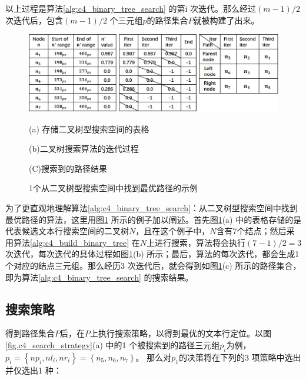         以上过程是算法\ref{alg:c4_binary_tree_search} 的第i 次迭代。那么经过$(m-1)/2$次迭代后，包含$(m-1)/2$ 个三元组$p$的路径集合$P$就被构建了出来。

        \begin{figure}[!h]
        \centering
        \includegraphics[width=\textwidth]{./figures/c4_bianry_tree_search.jpg}
        \begin{minipage}[t]{0.33\linewidth}
        \centerline{\small (a) 存储二叉树型搜索空间的表格}
        \end{minipage}
        \begin{minipage}[t]{0.33\linewidth}
        \centerline{\small(b)二叉树搜索算法的迭代过程}
        \end{minipage}
        \begin{minipage}[t]{0.26\linewidth}
        \centerline{\small(C)搜索到的路径结果}
        \end{minipage}
        \caption{1个从二叉树型搜索空间中找到最优路径的示例}
        \label{fig.c4_bianry_tree_search}
        \end{figure}

        为了更直观地理解算法\ref{alg:c4_binary_tree_search}：从二叉树型搜索空间中找到最优路径的算法，这里用图\ref{fig.c4_bianry_tree_search} 所示的例子加以阐述。首先图\ref{fig.c4_bianry_tree_search}(a) 中的表格存储的是代表候选文本行搜索空间的二叉树$N$，且在这个例子中，$N$含有7个结点；然后采用算法\ref{alg:c4_build_binary_tree} 在$N$上进行搜索，算法将会执行$(7-1)/2=3$ 次迭代，每次迭代的具体过程如图\ref{fig.c4_bianry_tree_search}(b) 所示；最后，算法的每次迭代，都会生成1 个对应的结点三元组。那么经历3 次迭代后，就会得到如图\ref{fig.c4_bianry_tree_search}(c) 所示的路径集合，即为算法\ref{alg:c4_binary_tree_search} 的搜索结果。

        \subsection{搜索策略}
        \label{sec.c4_searching strategies}

        得到路径集合$P$后，在$P$上执行搜索策略，以得到最优的文本行定位。以图\ref{fig.c4_search_strategy}(a) 中的1 个被搜索到的路径三元组$p_i$为例，$p_i=\left\{np_i,nl_i,nr_i\right\}=\left\{n_5,n_6,n_7\right\}$。 那么对$p_1$的决策将在下列的3 项策略中选出并仅选出1 种：

